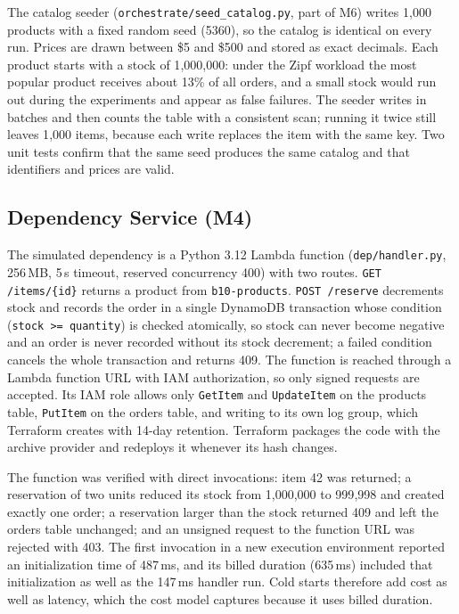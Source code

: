 \documentclass[10pt]{article}
\begin{document}
The catalog seeder (\texttt{orchestrate/seed\_catalog.py}, part of M6) writes
1{,}000 products with a fixed random seed (5360), so the catalog is identical on
every run. Prices are drawn between \$5 and \$500 and stored as exact decimals.
Each product starts with a stock of 1{,}000{,}000: under the Zipf workload the
most popular product receives about 13\% of all orders, and a small stock would
run out during the experiments and appear as false failures. The seeder writes
in batches and then counts the table with a consistent scan; running it twice
still leaves 1{,}000 items, because each write replaces the item with the same
key. Two unit tests confirm that the same seed produces the same catalog and that
identifiers and prices are valid.

\subsection{Dependency Service (M4)}
The simulated dependency is a Python 3.12 Lambda function
(\texttt{dep/handler.py}, 256\,MB, 5\,s timeout, reserved concurrency 400) with
two routes. \texttt{GET /items/\{id\}} returns a product from
\texttt{b10-products}. \texttt{POST /reserve} decrements stock and records the
order in a single DynamoDB transaction whose condition
(\texttt{stock >= quantity}) is checked atomically, so stock can never become
negative and an order is never recorded without its stock decrement; a failed
condition cancels the whole transaction and returns 409. The function is reached
through a Lambda function URL with IAM authorization, so only signed requests are
accepted. Its IAM role allows only \texttt{GetItem} and \texttt{UpdateItem} on
the products table, \texttt{PutItem} on the orders table, and writing to its own
log group, which Terraform creates with 14-day retention. Terraform packages the
code with the archive provider and redeploys it whenever its hash changes.

The function was verified with direct invocations: item 42 was returned; a
reservation of two units reduced its stock from 1{,}000{,}000 to 999{,}998 and
created exactly one order; a reservation larger than the stock returned 409 and
left the orders table unchanged; and an unsigned request to the function URL
was rejected with 403. The first invocation in a new execution environment
reported an initialization time of 487\,ms, and its billed duration (635\,ms)
included that initialization as well as the 147\,ms handler run. Cold starts
therefore add cost as well as latency, which the cost model captures because it
uses billed duration.
\end{document}
